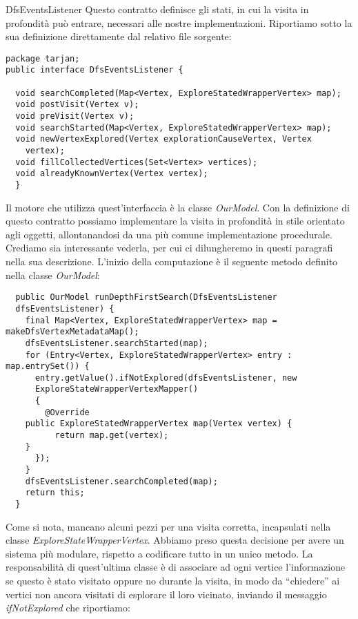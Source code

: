 \begin{paragraph}{DfsEventsListener}
  Questo contratto definisce gli stati, in cui la visita in
  profondit\`a pu\`o entrare, necessari alle nostre
  implementazioni. Riportiamo sotto la sua definizione direttamente
  dal relativo file sorgente:

\begin{lstlisting}
package tarjan; 
public interface DfsEventsListener {

  void searchCompleted(Map<Vertex, ExploreStatedWrapperVertex> map);
  void postVisit(Vertex v);
  void preVisit(Vertex v);
  void searchStarted(Map<Vertex, ExploreStatedWrapperVertex> map);
  void newVertexExplored(Vertex explorationCauseVertex, Vertex
    vertex);
  void fillCollectedVertices(Set<Vertex> vertices);
  void alreadyKnownVertex(Vertex vertex);
  }
\end{lstlisting}
Il motore che utilizza quest'interfaccia \`e la classe
\emph{OurModel}. Con la definizione di questo contratto possiamo
implementare la visita in profondit\`a in stile orientato agli
oggetti, allontanandosi da una pi\`u comune implementazione
procedurale. Crediamo sia interessante vederla, per cui ci
dilungheremo in questi paragrafi nella sua descrizione. L'inizio della
computazione \`e il seguente metodo definito nella classe
\emph{OurModel}:
\begin{lstlisting}
  public OurModel runDepthFirstSearch(DfsEventsListener
  dfsEventsListener) { 
    final Map<Vertex, ExploreStatedWrapperVertex> map = makeDfsVertexMetadataMap();
    dfsEventsListener.searchStarted(map);
    for (Entry<Vertex, ExploreStatedWrapperVertex> entry : map.entrySet()) {
      entry.getValue().ifNotExplored(dfsEventsListener,	new
      ExploreStateWrapperVertexMapper() 
      {
        @Override
	public ExploreStatedWrapperVertex map(Vertex vertex) {
          return map.get(vertex);
	}
      });
    }
    dfsEventsListener.searchCompleted(map);
    return this;
  }
\end{lstlisting}
Come si nota, mancano alcuni pezzi per una visita corretta,
incapsulati nella classe \emph{ExploreStateWrapperVertex}. Abbiamo
preso questa decisione per avere un sistema pi\`u modulare, rispetto a
codificare tutto in un unico metodo. La responsabilit\`a di
quest'ultima classe \`e di associare ad ogni vertice l'informazione se
questo \`e stato visitato oppure no durante la visita, in modo da
``chiedere'' ai vertici non ancora visitati di esplorare il loro
vicinato, inviando il messaggio \emph{ifNotExplored} che riportiamo:
\begin{lstlisting}

\end{lstlisting}
\end{paragraph}
